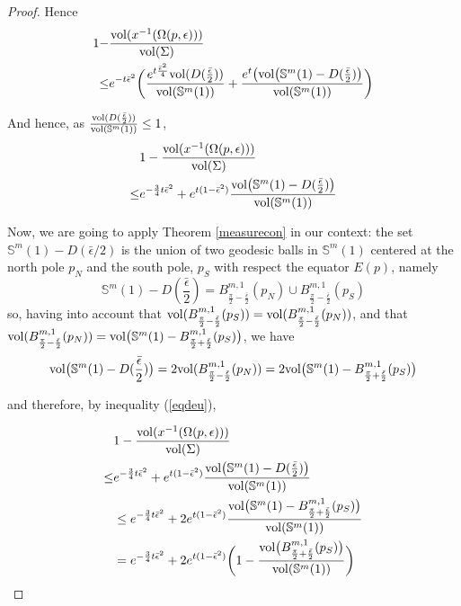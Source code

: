 \documentclass{amsart}
\theoremstyle{definition}
\theoremstyle{remark}
\newcommand{\ese}{\mathbb{S}}
\begin{document}
\begin{proof}
Hence
\begin{equation}\label{eqnou}
 \begin{aligned}
1-&\frac{{\rm vol}(x^{-1}(\Omega(p,\epsilon)))}{{\rm vol}(\Sigma)}\\\leq &e^{-t\bar\epsilon^2}\bigg(\frac{e^{t\frac{ \bar\epsilon^2}{4} }{\rm vol}(D(\frac{\bar\epsilon}{2}))}{{\rm vol}(\mathbb{S}^m(1))}+\frac{e^t \big({\rm vol}\big(\mathbb{S}^m(1)-D(\frac{\bar\epsilon}{2})\big)}{{\rm vol}(\mathbb{S}^m(1))}\bigg)
\end{aligned}
\end{equation}

And hence, as $\frac{{\rm vol}(D(\frac{\bar\epsilon}{2}))}{{\rm vol}(\mathbb{S}^m(1))}\leq 1$,
\begin{equation}\label{eqdeu}
 \begin{aligned}
&1-\frac{{\rm vol}(x^{-1}(\Omega(p,\epsilon)))}{{\rm vol}(\Sigma)}\\\leq &e^{-\frac{3}{4}t\bar\epsilon^2}+e^{t(1-\bar\epsilon^2)}\frac{{\rm vol}\big(\mathbb{S}^m(1)-D(\frac{\bar\epsilon}{2})\big)}{{\rm vol}(\mathbb{S}^m(1))}\end{aligned}
\end{equation}

Now, we are going to apply Theorem \ref{measurecon} in our context: the set $\ese^m(1)-D(\bar\epsilon/2)$ is the union of two geodesic balls in $\ese^m(1)$ centered at the north pole $p_N$ and the south pole, $p_S$ with respect the equator $E(p)$, namely
$$\ese^m(1)-D(\frac{\bar\epsilon}{2})=B^{m,1}_{\frac{\pi}{2}-\frac{\bar\epsilon}{2}}(p_N) \cup B^{m,1}_{\frac{\pi}{2}-\frac{\bar\epsilon}{2}}(p_S)$$
\noindent so, having into account that ${\rm vol}(B^{m,1}_{\frac{\pi}{2}-\frac{\bar\epsilon}{2}}(p_S))={\rm vol}(B^{m,1}_{\frac{\pi}{2}-\frac{\bar\epsilon}{2}}(p_N))$, and that ${\rm vol}(B^{m,1}_{\frac{\pi}{2}-\frac{\bar\epsilon}{2}}(p_N))={\rm vol}\big(\ese^m(1)-B^{m,1}_{\frac{\pi}{2}+\frac{\bar\epsilon}{2}}(p_S)\big)$, we have
$${\rm vol}\big(\mathbb{S}^m(1)-D(\frac{\bar\epsilon}{2})\big)=2{\rm vol}(B^{m,1}_{\frac{\pi}{2}-\frac{\bar\epsilon}{2}}(p_N))=2{\rm vol}\big(\ese^m(1)-B^{m,1}_{\frac{\pi}{2}+\frac{\bar\epsilon}{2}}(p_S)\big)$$

\noindent and therefore, by inequality (\ref{eqdeu}),

\begin{equation}\label{eqonze}
 \begin{aligned}
&1-\frac{{\rm vol}(x^{-1}(\Omega(p,\epsilon)))}{{\rm vol}(\Sigma)}\\\leq &e^{-\frac{3}{4}t\bar\epsilon^2}+e^{t(1-\bar\epsilon^2)}\frac{{\rm vol}\big(\mathbb{S}^m(1)-D(\frac{\bar\epsilon}{2})\big)}{{\rm vol}(\mathbb{S}^m(1))}\\ &\leq e^{-\frac{3}{4}t\bar\epsilon^2}+2e^{t(1-\bar\epsilon^2)}\frac{{\rm vol}\big(\ese^m(1)-B^{m,1}_{\frac{\pi}{2}+\frac{\bar\epsilon}{2}}(p_S) \big)}{{\rm vol}(\mathbb{S}^m(1))}\\& =e^{-\frac{3}{4}t\bar\epsilon^2}+2e^{t(1-\bar\epsilon^2)}\bigg(1-\frac{{\rm vol}\big(B^{m,1}_{\frac{\pi}{2}+\frac{\bar\epsilon}{2}}(p_S) \big)}{{\rm vol}(\mathbb{S}^m(1))}\bigg)
\end{aligned}
\end{equation}



\end{proof}
\end{document}
